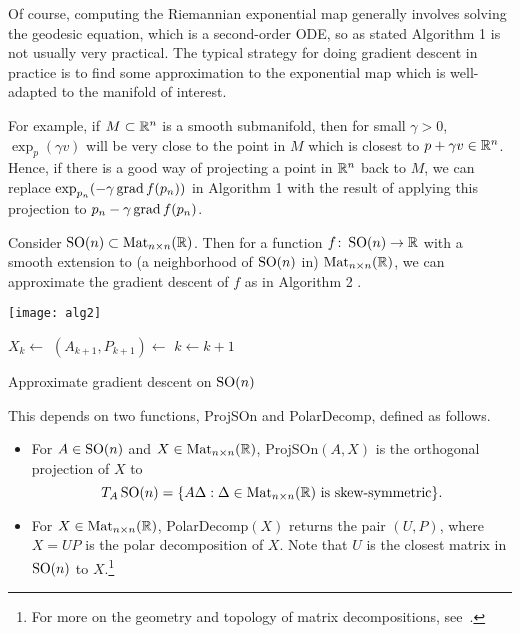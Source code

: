 Of course, computing the Riemannian exponential map generally involves solving the geodesic equation, which is a second-order ODE, so as stated \ifplastex Algorithm 1 \else {} \fi is not usually very practical. The typical strategy for doing gradient descent in practice is to find some approximation to the exponential map which is well-adapted to the manifold of interest. 

For example, if $M \subset \mathbb{R}^n$ is a smooth submanifold, then for small $\gamma > 0$, $\exp_p(\gamma v)$ will be very close to the point in $M$ which is closest to $p + \gamma v \in \mathbb{R}^n$. Hence, if there is a good way of projecting a point in $\mathbb{R}^n$ back to $M$, we can replace $\exp_{p_n}(-\gamma \operatorname{grad} f(p_n))$  in \ifplastex Algorithm 1 \else {} \fi with the result of applying this projection to $p_n - \gamma \operatorname{grad} f(p_n) $.

\begin{example}
	Consider $\operatorname{SO}(n) \subset \operatorname{Mat}_{n \times n}(\mathbb{R})$. Then for a function $f \colon\thinspace\! \operatorname{SO}(n) \to \mathbb{R}$ with a smooth extension to (a neighborhood of $\operatorname{SO}(n)$ in) $ \operatorname{Mat}_{n \times n}(\mathbb{R})$, we can approximate the gradient descent of $f$ as in \ifplastex Algorithm 2 \else {} \fi. 
	
	
\ifplastex
	\begin{center}
		\texttt{[image: alg2]}
	\end{center}
\else
	\begin{algorithm}[H]
	\begin{algorithmic}
	\Repeat
		\State $X_{k} \gets $ 
		\State $(A_{k+1}, P_{k+1}) \gets $ 
		\State $k \gets k+1$
	\EndProcedure
	\end{algorithmic}
	\caption{Approximate gradient descent on $\operatorname{SO}(n)$}
	\label{alg:gradient descent so(n)}
	\end{algorithm}
\fi
	
	This depends on two functions, {\sc ProjSOn} and {\sc PolarDecomp}, defined as follows.
		\begin{itemize}
			\item For $A \in \operatorname{SO}(n)$ and $X \in \operatorname{Mat}_{n \times n}(\mathbb{R})$, {\sc ProjSOn}$(A,X)$ is the orthogonal projection of $X$ to 
		\[
			T_A \operatorname{SO}(n) = \{A \Delta : \Delta \in \operatorname{Mat}_{n \times n}(\mathbb{R}) \text{ is skew-symmetric}\}.
		\]
	
		\item For $X \in \operatorname{Mat}_{n \times n}(\mathbb{R})$, {\sc PolarDecomp}$(X)$ returns the pair $(U,P)$, where $X = UP$ is the polar decomposition of $X$. Note that $U$ is the closest matrix in $\operatorname{SO}(n)$ to $X$.\footnote{For more on the geometry and topology of matrix decompositions, see~\cite{deturckMakingMatricesBetter2017b}.}
		\end{itemize}
\end{example}


